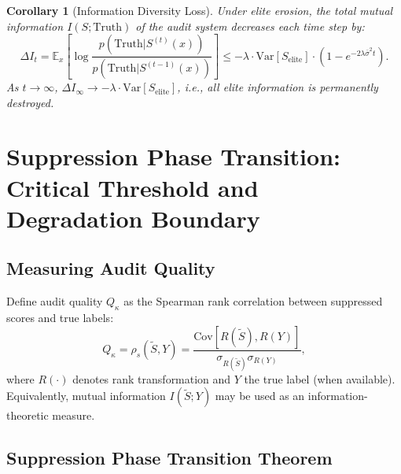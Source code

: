\documentclass[12pt,a4paper]{article}
\newtheorem{corollary}[theorem]{Corollary}
\theoremstyle{definition}
\newcommand{\E}{\mathbb{E}}
\newcommand{\Var}{\mathrm{Var}}
\newcommand{\Cov}{\mathrm{Cov}}
\begin{document}
\begin{corollary}[Information Diversity Loss]
\label{cor:info_loss}
Under elite erosion, the total mutual information $I(S; \text{Truth})$ of the audit system decreases each time step by:
\begin{equation}
    \Delta I_t = \E_{x}\left[\log\frac{p(\text{Truth}|S^{(t)}(x))}{p(\text{Truth}|S^{(t-1)}(x))}\right] \leq -\lambda \cdot \Var[S_{\text{elite}}] \cdot (1 - e^{-2\lambda\bar{\sigma}^2 t}).
\end{equation}
As $t \to \infty$, $\Delta I_\infty \to -\lambda \cdot \Var[S_{\text{elite}}]$, i.e., all elite information is permanently destroyed.
\end{corollary}

\section{Suppression Phase Transition: Critical Threshold and Degradation Boundary}
\label{sec:phase_transition}

\subsection{Measuring Audit Quality}

Define audit quality $Q_\kappa$ as the Spearman rank correlation between suppressed scores and true labels:
\begin{equation}
    Q_\kappa = \rho_s(\tilde{S}, Y) = \frac{\Cov[R(\tilde{S}), R(Y)]}{\sigma_{R(\tilde{S})}\sigma_{R(Y)}},
\end{equation}
where $R(\cdot)$ denotes rank transformation and $Y$ the true label (when available). Equivalently, mutual information $I(\tilde{S}; Y)$ may be used as an information-theoretic measure.

\subsection{Suppression Phase Transition Theorem}
\end{document}
